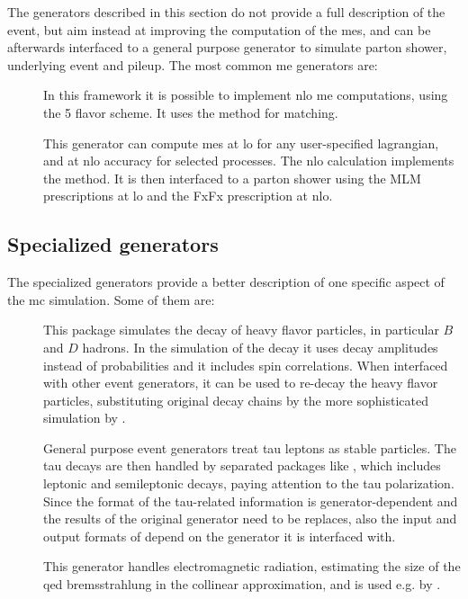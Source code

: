 The generators described in this section do not provide a full description of the event, but aim instead at improving the 
computation of the \glspl{me}, and can be afterwards interfaced to a general purpose generator to simulate parton shower, underlying event and pileup. The most common \gls{me} generators are:

\begin{description}
\item[\PowhegBox] \cite{Alioli:2010xd} In this framework it is possible to implement \gls{nlo} \gls{me} computations, using the 5 flavor scheme.
It uses the \Powheg method for matching. 

\item[\aNLO] \cite{Alwall:2014hca} This generator can compute \glspl{me} at \gls{lo} for any user-specified lagrangian, and at \gls{nlo} accuracy for selected processes. %
The \gls{nlo} calculation implements the \mcatnlo method. 
It is then interfaced to a parton shower using the 
MLM prescriptions at \gls{lo} and the FxFx prescription at \gls{nlo}.

\end{description}

\subsection{Specialized generators}

The specialized generators provide a better description of one specific aspect of the \gls{mc} simulation. Some of them are:

\begin{description}
\item[\evtgen] \cite{Lange:2001uf} This package simulates the decay of heavy flavor particles, in particular $B$ and $D$ hadrons. 
In the simulation of the decay it uses decay amplitudes instead of probabilities and it includes spin correlations. 
When interfaced with other event generators, it can be used to re-decay the heavy flavor particles, 
substituting original decay chains by the more sophisticated simulation by \evtgen.

\item[\tauola] \cite{Jadach:1990mz} General purpose event generators treat tau leptons as stable particles. 
The tau decays are then handled by separated packages like \tauola, which includes leptonic and semileptonic decays, paying attention to the tau polarization. Since the format of the tau-related information is generator-dependent and the results of the original generator need to be replaces, also the input and output formats of \tauola depend on the generator it is interfaced with.

\item[\photos] \cite{Barberio:1990ms} This generator handles electromagnetic radiation, estimating the size of the \gls{qed} bremsstrahlung in the collinear approximation, and is used e.g. by \tauola. 


\end{description}


